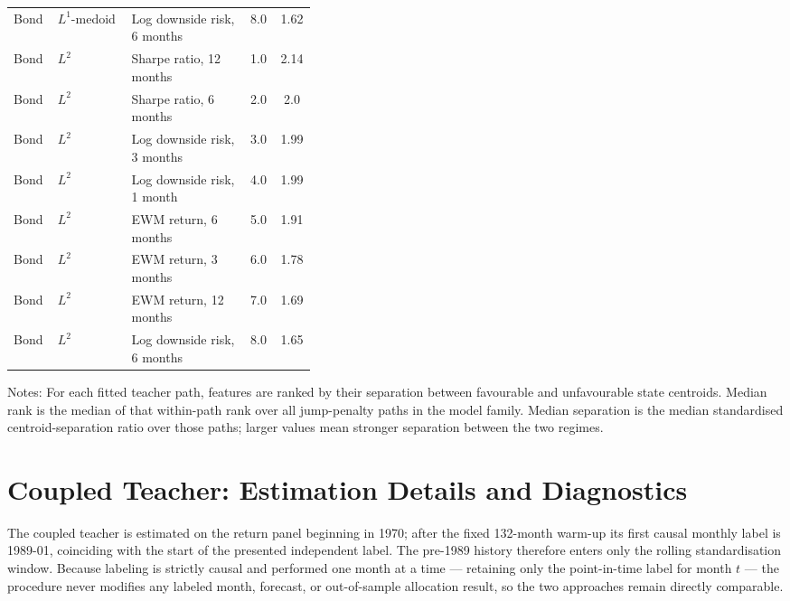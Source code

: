 \begin{table}[H]
\begin{tabular}{llp{0.39\linewidth}cc}
Bond & $L^1$-medoid & Log downside risk, 6 months & 8.0 & 1.62 \\
Bond & $L^2$ & Sharpe ratio, 12 months & 1.0 & 2.14 \\
Bond & $L^2$ & Sharpe ratio, 6 months & 2.0 & 2.0 \\
Bond & $L^2$ & Log downside risk, 3 months & 3.0 & 1.99 \\
Bond & $L^2$ & Log downside risk, 1 month & 4.0 & 1.99 \\
Bond & $L^2$ & EWM return, 6 months & 5.0 & 1.91 \\
Bond & $L^2$ & EWM return, 3 months & 6.0 & 1.78 \\
Bond & $L^2$ & EWM return, 12 months & 7.0 & 1.69 \\
Bond & $L^2$ & Log downside risk, 6 months & 8.0 & 1.65 \\
\bottomrule
\end{tabular}
\par\vspace{0.35em}
\begin{minipage}{0.92\linewidth}
\footnotesize Notes: For each fitted teacher path, features are ranked by their separation between favourable and unfavourable state centroids. Median rank is the median of that within-path rank over all jump-penalty paths in the model family. Median separation is the median standardised centroid-separation ratio over those paths; larger values mean stronger separation between the two regimes.
\end{minipage}
\end{table}

\section{Coupled Teacher: Estimation Details and Diagnostics}
\label{app:teacher-coupled}

The coupled teacher is estimated on the return panel beginning in 1970; after the fixed
132-month warm-up its first causal monthly label is 1989-01, coinciding with the start of the
presented independent label. The pre-1989 history therefore enters only the rolling standardisation window. Because labeling is strictly causal and performed one month at a time — retaining only the point-in-time label for month $t$
— the procedure never modifies any labeled month, forecast, or out-of-sample allocation result, so the two approaches remain directly comparable.

